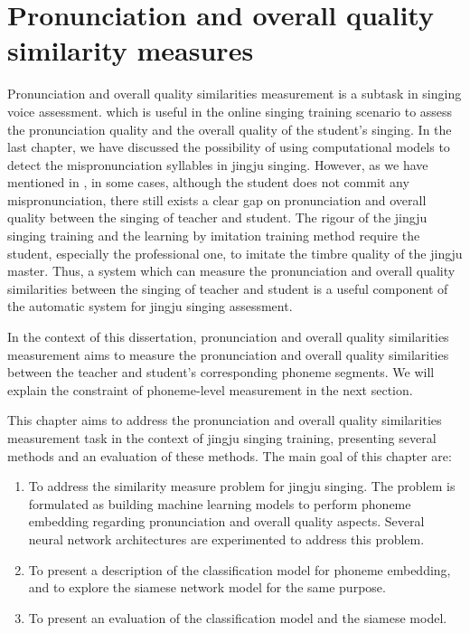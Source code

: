 \chapter{Pronunciation and overall quality similarity measures}\label{chap:similarity_pronunciation}

Pronunciation and overall quality similarities measurement is a subtask in singing voice assessment. which is useful in the online singing training scenario to assess the pronunciation quality and the overall quality of the student's singing. In the last chapter, we have discussed the possibility of using computational models to detect the mispronunciation syllables in jingju singing. However, as we have mentioned in , in some cases, although the student does not commit any mispronunciation, there still exists a clear gap on pronunciation and overall quality between the singing of teacher and student. The rigour of the jingju singing training and the learning by imitation training method require the student, especially the professional one, to imitate the timbre quality of the jingju master. Thus, a system which can measure the pronunciation and overall quality similarities between the singing of teacher and student is a useful component of the automatic system for jingju singing assessment.

In the context of this dissertation, pronunciation and overall quality similarities measurement aims to measure the pronunciation and overall quality similarities between the teacher and student's corresponding phoneme segments. We will explain the constraint of phoneme-level measurement in the next section.

This chapter aims to address the pronunciation and overall quality similarities measurement task in the context of jingju singing training, presenting several methods and an evaluation of these methods. The main goal of this chapter are:

\begin{enumerate}[leftmargin=*]
\item To address the similarity measure problem for jingju singing. The problem is formulated as building machine learning models to perform phoneme embedding regarding pronunciation and overall quality aspects. Several neural network architectures are experimented to address this problem.

\item To present a description of the classification model for phoneme embedding, and to explore the siamese network model for the same purpose.

\item To present an evaluation of the classification model and the siamese model.
\end{enumerate}

